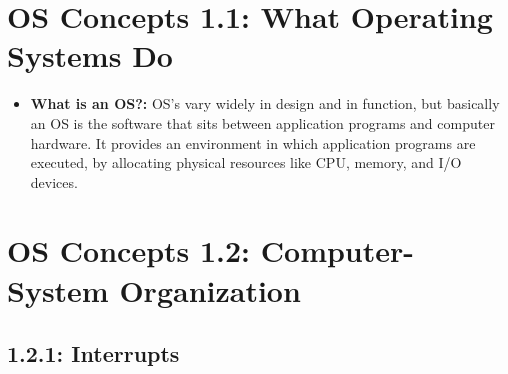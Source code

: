 \documentclass[12pt]{article}
\begin{document}
\section*{OS Concepts 1.1: What Operating Systems Do}

\begin{itemize}
    \item \textbf{What is an OS?:} OS's vary widely in design and in function, but basically an OS is the software that sits between application programs and computer hardware. It provides an environment in which application programs are executed, by allocating physical resources like CPU, memory, and I/O devices.
\end{itemize}

\section*{OS Concepts 1.2: Computer-System Organization}

\subsection*{1.2.1: Interrupts}
\end{document}
